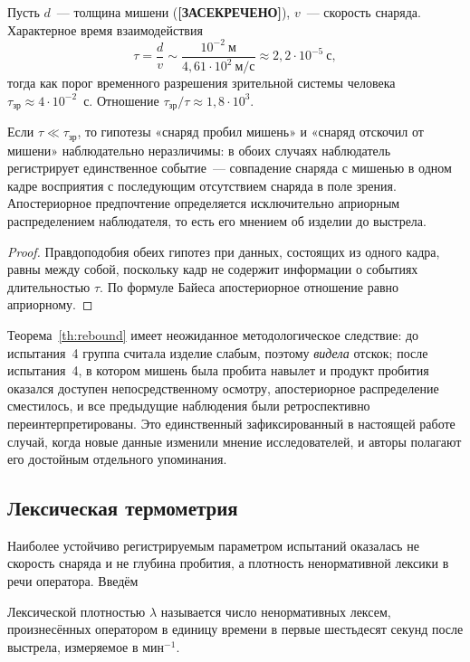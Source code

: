\documentclass[11pt,a4paper]{article}
\newcommand{\SEC}{\textbf{[ЗАСЕКРЕЧЕНО]}}
\begin{document}
Пусть $d$~--- толщина мишени (\SEC), $v$~--- скорость снаряда. Характерное время взаимодействия
\[
\tau=\frac{d}{v}\sim\frac{10^{-2}~\text{м}}{4{,}61\cdot10^{2}~\text{м/с}}\approx2{,}2\cdot10^{-5}~\text{с},
\]
тогда как порог временного разрешения зрительной системы человека $\tau_{\text{зр}}\approx4\cdot10^{-2}$~с. Отношение $\tau_{\text{зр}}/\tau\approx1{,}8\cdot10^{3}$.

\begin{theorem}\label{th:rebound}
Если $\tau\ll\tau_{\text{зр}}$, то гипотезы «снаряд пробил мишень» и «снаряд отскочил от мишени» наблюдательно неразличимы: в обоих случаях наблюдатель регистрирует единственное событие~--- совпадение снаряда с мишенью в одном кадре восприятия с последующим отсутствием снаряда в поле зрения. Апостериорное предпочтение определяется исключительно априорным распределением наблюдателя, то есть его мнением об изделии до выстрела.
\end{theorem}

\begin{proof}
Правдоподобия обеих гипотез при данных, состоящих из одного кадра, равны между собой, поскольку кадр не содержит информации о событиях длительностью $\tau$. По формуле Байеса апостериорное отношение равно априорному.
\end{proof}

Теорема~\ref{th:rebound} имеет неожиданное методологическое следствие: до испытания~4 группа считала изделие слабым, поэтому \emph{видела} отскок; после испытания~4, в котором мишень была пробита навылет и продукт пробития оказался доступен непосредственному осмотру, апостериорное распределение сместилось, и все предыдущие наблюдения были ретроспективно переинтерпретированы. Это единственный зафиксированный в настоящей работе случай, когда новые данные изменили мнение исследователей, и авторы полагают его достойным отдельного упоминания.

\subsection{Лексическая термометрия}

Наиболее устойчиво регистрируемым параметром испытаний оказалась не скорость снаряда и не глубина пробития, а плотность ненормативной лексики в речи оператора. Введём

\begin{definition}
Лексической плотностью $\lambda$ называется число ненормативных лексем, произнесённых оператором в единицу времени в первые шестьдесят секунд после выстрела, измеряемое в мин$^{-1}$.
\end{definition}
\end{document}
